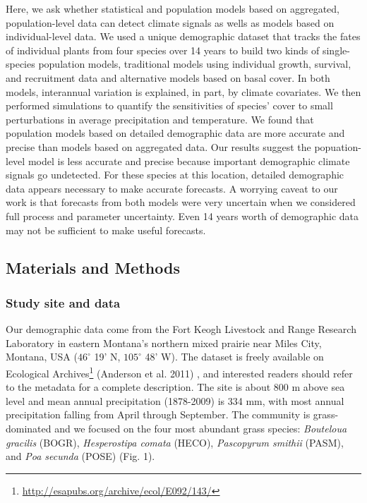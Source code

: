 \documentclass[12pt,]{article}
\begin{document}
Here, we ask whether statistical and population models based on
aggregated, population-level data can detect climate signals as wells as
models based on individual-level data. We used a unique demographic
dataset that tracks the fates of individual plants from four species
over 14 years to build two kinds of single-species population models,
traditional models using individual growth, survival, and recruitment
data and alternative models based on basal cover. In both models,
interannual variation is explained, in part, by climate covariates. We
then performed simulations to quantify the sensitivities of species'
cover to small perturbations in average precipitation and temperature.
We found that population models based on detailed demographic data are
more accurate and precise than models based on aggregated data. Our
results suggest the popuation-level model is less accurate and precise
because important demographic climate signals go undetected. For these
species at this location, detailed demographic data appears necessary to
make accurate forecasts. A worrying caveat to our work is that forecasts
from both models were very uncertain when we considered full process and
parameter uncertainty. Even 14 years worth of demographic data may not
be sufficient to make useful forecasts.

\subsection{Materials and Methods}\label{materials-and-methods}

\subsubsection{Study site and data}\label{study-site-and-data}

Our demographic data come from the Fort Keogh Livestock and Range
Research Laboratory in eastern Montana's northern mixed prairie near
Miles City, Montana, USA ($46^{\circ}$ 19' N, $105^{\circ}$ 48' W). The
dataset is freely available on Ecological Archives\footnote{\url{http://esapubs.org/archive/ecol/E092/143/}}
(Anderson et al. 2011) , and interested readers should refer to the
metadata for a complete description. The site is about 800 m above sea
level and mean annual precipitation (1878-2009) is 334 mm, with most
annual precipitation falling from April through September. The community
is grass-dominated and we focused on the four most abundant grass
species: \emph{Bouteloua gracilis} (BOGR), \emph{Hesperostipa comata}
(HECO), \emph{Pascopyrum smithii} (PASM), and \emph{Poa secunda} (POSE)
(Fig. 1).
\end{document}
